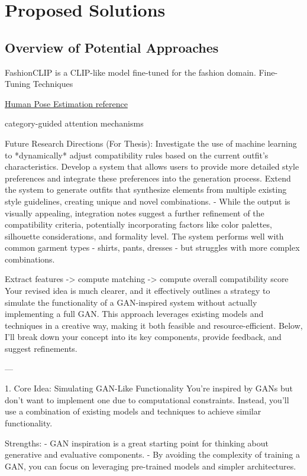 \chapter{Proposed Solutions}
\section{Overview of Potential Approaches}

FashionCLIP is a CLIP-like model fine-tuned for the fashion domain.
Fine-Tuning Techniques

\href{https://viso.ai/deep-learning/pose-estimation-ultimate-overview/}{Human Pose Estimation reference}

category-guided attention mechanisms

Future Research Directions (For Thesis): Investigate the use of machine learning to *dynamically* adjust compatibility rules based on the current outfit’s characteristics. Develop a system that allows users to provide more detailed style preferences and integrate these preferences into the generation process. Extend the system to generate outfits that synthesize elements from multiple existing style guidelines, creating unique and novel combinations. - While the output is visually appealing, integration notes suggest a further refinement of the compatibility criteria, potentially incorporating factors like color palettes, silhouette considerations, and formality level.  The system performs well with common garment types - shirts, pants, dresses - but struggles with more complex combinations.

Extract features -> compute matching -> compute overall compatibility score
Your revised idea is much clearer, and it effectively outlines a strategy to simulate the functionality of a GAN-inspired system without actually implementing a full GAN. This approach leverages existing models and techniques in a creative way, making it both feasible and resource-efficient. Below, I'll break down your concept into its key components, provide feedback, and suggest refinements.

---

1. Core Idea: Simulating GAN-Like Functionality
You're inspired by GANs but don't want to implement one due to computational constraints. Instead, you'll use a combination of existing models and techniques to achieve similar functionality.

Strengths:
- GAN inspiration is a great starting point for thinking about generative and evaluative components.
- By avoiding the complexity of training a GAN, you can focus on leveraging pre-trained models and simpler architectures.

